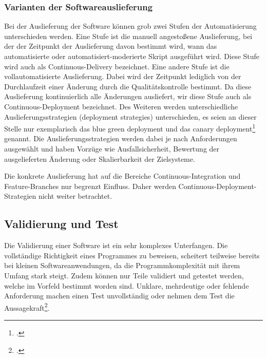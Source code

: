 \subsubsection{Varianten der Softwareauslieferung}

Bei der Auslieferung der Software können grob zwei Stufen der Automatisierung unterschieden werden. Eine Stufe ist die manuell angestoßene Auslieferung, bei der der Zeitpunkt der Auslieferung davon bestimmt wird, wann das automatisierte 
oder automatisiert-moderierte Skript ausgeführt wird. Diese Stufe wird auch als \glqq Continuous-Delivery\grqq{} bezeichnet. Eine andere Stufe ist die vollautomatisierte Auslieferung. Dabei wird der
Zeitpunkt lediglich von der Durchlaufzeit einer Änderung durch die Qualitätskontrolle bestimmt. Da diese Auslieferung kontinuierlich alle Änderungen ausliefert, wir diese Stufe auch als \glqq Continuous-Deployment\grqq{} bezeichnet.
Des Weiteren werden unterschiedliche Auslieferungsstrategien (\glqq deployment strategies\grqq{}) unterschieden, es seien an
dieser Stelle nur exemplarisch das \glqq blue green deployment\grqq{} und das \glqq canary deployment\grqq{}\footcite[261-264 Deploying and Releasing Applications][]
{humble2010} genannt. Die Auslieferungsstrategien werden dabei je nach Anforderungen ausgewählt und haben Vorzüge wie 
Ausfallsicherheit, Bewertung der ausgelieferten Änderung oder Skalierbarkeit der Zielsysteme.

Die konkrete Auslieferung hat auf die Bereiche Continuous-Integration und Feature-Branches nur begrenzt Einfluss. Daher 
werden Continuous-Deployment-Strategien nicht weiter betrachtet.

\subsection{Validierung und Test}

Die Validierung einer Software ist ein sehr komplexes Unterfangen. Die vollständige Richtigkeit eines Programmes zu beweisen, scheitert teilweise bereits bei kleinen Softwareanwendungen, da die Programmkomplexität mit ihrem Umfang stark steigt. Zudem können nur Teile validiert und getestet werden, welche im Vorfeld bestimmt worden sind. Unklare, mehrdeutige oder 
fehlende Anforderung machen einen Test unvollständig oder nehmen dem Test die Aussagekraft\footcite[S. 243 Kapitel 4.6][]{software-quality2008}.

